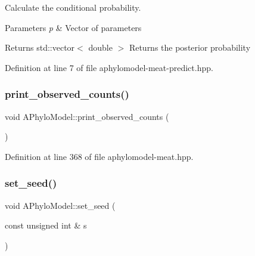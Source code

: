 Calculate the conditional probability. 


\begin{DoxyParams}{Parameters}
{\em p} & Vector of parameters \\
\hline
\end{DoxyParams}
\begin{DoxyReturn}{Returns}
std\+::vector$<$ double $>$ Returns the posterior probability 
\end{DoxyReturn}


Definition at line 7 of file aphylomodel-\/meat-\/predict.\+hpp.

\mbox{\label{class_a_phylo_model_a25623ae340bb6912a0427279b779c450}} 
\subsubsection{\texorpdfstring{print\+\_\+observed\+\_\+counts()}{print\_observed\_counts()}}
{\footnotesize\ttfamily void A\+Phylo\+Model\+::print\+\_\+observed\+\_\+counts (\begin{DoxyParamCaption}{ }\end{DoxyParamCaption})\hspace{0.3cm}{\ttfamily [inline]}}



Definition at line 368 of file aphylomodel-\/meat.\+hpp.

\mbox{\label{class_a_phylo_model_a5f3faed4bad372764c056d1686508d6e}} 
\subsubsection{\texorpdfstring{set\+\_\+seed()}{set\_seed()}}
{\footnotesize\ttfamily void A\+Phylo\+Model\+::set\+\_\+seed (\begin{DoxyParamCaption}\item[{const unsigned int \&}]{s }\end{DoxyParamCaption})\hspace{0.3cm}{\ttfamily [inline]}}



